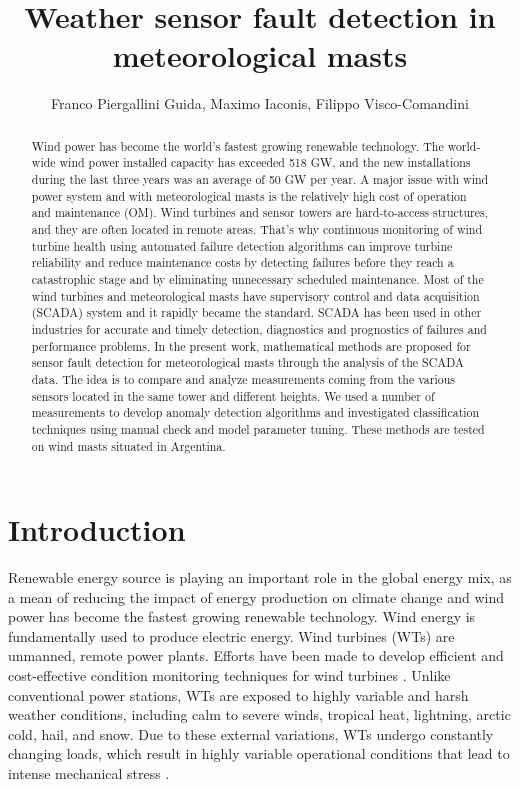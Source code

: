 \documentclass[journal]{IEEEtran}
\begin{document}
\title{Weather sensor fault detection in meteorological masts}

\author{Franco Piergallini Guida, Maximo Iaconis, Filippo Visco-Comandini}
\maketitle

\begin{abstract}
Wind power has become the world's fastest growing renewable technology. The world-wide wind power installed capacity has exceeded 518 GW, and the new installations during the last three years was an average of 50 GW per year. A major issue with wind power system and with meteorological masts is the relatively high cost of operation and maintenance (OM). Wind turbines and sensor towers are hard-to-access structures, and they are often located in remote areas. That's why continuous monitoring of wind turbine health using automated failure detection algorithms can improve turbine reliability and reduce maintenance costs by detecting failures before they reach a catastrophic stage and by eliminating unnecessary scheduled maintenance.
Most of the wind turbines and meteorological masts have supervisory control and data acquisition (SCADA) system and it rapidly became the standard. SCADA has been used in other industries for accurate and timely detection, diagnostics and prognostics of failures and performance problems.
In the present work, mathematical methods are proposed for sensor fault detection for meteorological masts through the analysis of the SCADA data. The idea is to compare and analyze measurements coming from the various sensors located in the same tower and different heights. We used a number of measurements to develop anomaly detection algorithms and investigated classification techniques using manual check and model parameter tuning. 
These methods are tested on wind masts situated in Argentina.
\end{abstract}
\section{Introduction}
Renewable energy source is playing an important role in the global energy mix, as a mean of reducing the impact of energy production on climate change and wind power has become the fastest growing renewable technology. 
Wind energy is fundamentally used to produce electric energy. Wind turbines (WTs) are unmanned, remote power plants.  Efforts have been made to develop efficient and cost-effective condition monitoring techniques for wind turbines \cite{yang2014wind}. Unlike conventional power stations, WTs are exposed to highly variable and harsh weather conditions, including calm to severe winds, tropical heat, lightning, arctic cold, hail, and snow. Due to these external variations, WTs undergo constantly changing loads, which result in highly variable operational conditions that lead to intense mechanical stress \cite{ribrant2006thesis}. 
\end{document}
